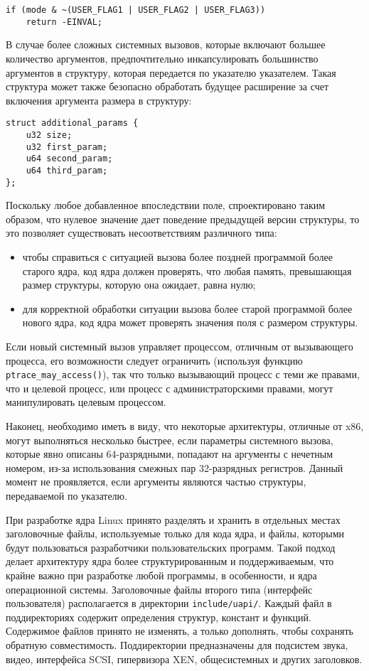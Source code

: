 \medskip
\begin{lstlisting}[style=cstyle]
if (mode & ~(USER_FLAG1 | USER_FLAG2 | USER_FLAG3))
	return -EINVAL;
\end{lstlisting}
\medskip

В случае более сложных системных вызовов, которые включают большее количество
аргументов, предпочтительно инкапсулировать большинство аргументов в структуру,
которая передается по указателю указателем. Такая структура может также
безопасно обработать будущее расширение за счет включения аргумента размера в
структуру:

\medskip
\begin{lstlisting}[style=cstyle]
struct additional_params {
	u32 size;
	u32 first_param;
	u64 second_param;
	u64 third_param;
};
\end{lstlisting}
\medskip

Поскольку любое добавленное впоследствии поле,
спроектировано таким образом, что нулевое значение дает поведение предыдущей
версии структуры, то это позволяет существовать несоответствиям различного типа:
\begin{itemize}
\item чтобы справиться с ситуацией вызова более поздней программой более старого
  ядра, код ядра должен проверять, что любая память, превышающая размер
  структуры, которую она ожидает, равна нулю;
\item для корректной обработки ситуации вызова более старой программой более
  нового ядра, код ядра может проверять значения поля с размером структуры.
\end{itemize}

Если новый системный вызов управляет процессом, отличным от вызывающего
процесса, его возможности следует ограничить (используя функцию
\texttt{ptrace\_may\_access()}), так что только вызывающий процесс с теми же
правами, что и целевой процесс, или процесс с администраторскими правами, могут
манипулировать целевым процессом.

Наконец, необходимо иметь в виду, что некоторые архитектуры, отличные от x86,
могут выполняться несколько быстрее, если параметры системного вызова, которые
явно описаны 64-разрядными, попадают на аргументы с нечетным номером, из-за
использования смежных пар 32-разрядных регистров. Данный момент не проявляется,
если аргументы являются частью структуры, передаваемой по указателю.

При разработке ядра Linux принято разделять и хранить в отдельных местах
заголовочные файлы, используемые только для кода ядра, и файлы, которыми будут
пользоваться разработчики пользовательских программ. Такой подход делает
архитектуру ядра более структурированным и поддерживаемым, что крайне важно при
разработке любой программы, в особенности, и ядра операционной системы.
Заголовочные файлы второго типа (интерфейс пользователя) располагается в
директории \texttt{include/uapi/}. Каждый файл в поддиректориях содержит
определения структур, констант и функций. Содержимое файлов принято не изменять,
а только дополнять, чтобы сохранять обратную совместимость. Поддиректории
предназначены для подсистем звука, видео, интерфейса SCSI, гипервизора XEN,
общесистемных и других заголовков.

